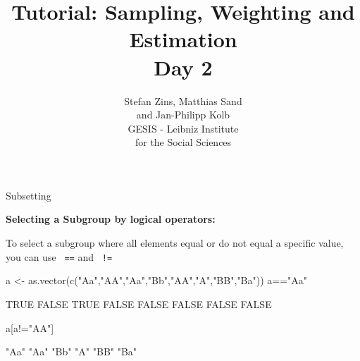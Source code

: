 \documentclass[11pt,german,hideothersubsections]{beamer}
\title[Day 1]{Tutorial: Sampling, Weighting and Estimation\\ \Large{Day 2} }
\author[M. Sand]{Stefan Zins, Matthias Sand\\ and Jan-Philipp Kolb\\ \vspace{.5cm} \footnotesize{GESIS - Leibniz Institute\\ for the Social Sciences}}
\newcommand{\R}[1]{{\tt \color{blue}  #1}}
\begin{document}

\maketitle

\begin{frame}[fragile]{Subsetting}
\footnotesize{
\begin{center}
\textbf{\normalsize{Selecting a Subgroup by logical operators:}}\\
\end{center}
\vspace{.25cm}
To select a subgroup where all elements equal or do not equal a specific value, you can use \R{==} and \R{!=}
\vspace{.25cm}
\begin{Schunk}
\begin{Sinput}
 a <- as.vector(c("Aa","AA","Aa","Bb","AA","A","BB","Ba"))
 a=="Aa"
\end{Sinput}
\begin{Soutput}
[1]  TRUE FALSE  TRUE FALSE FALSE FALSE FALSE FALSE
\end{Soutput}
\begin{Sinput}
 a[a!="AA"]
\end{Sinput}
\begin{Soutput}
[1] "Aa" "Aa" "Bb" "A"  "BB" "Ba"
\end{Soutput}
\end{Schunk}
}
\end{frame}
\end{document}
